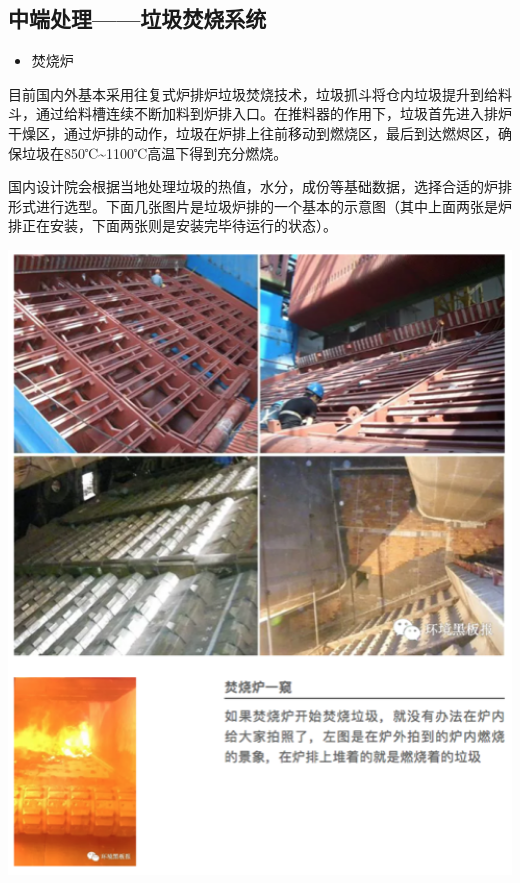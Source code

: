 \documentclass[
]{book}
\providecommand{\tightlist}{%
  \setlength{\itemsep}{0pt}\setlength{\parskip}{0pt}}
\begin{document}
\hypertarget{ux4e2dux7aefux5904ux7406ux5783ux573eux711aux70e7ux7cfbux7edf}{%
\subsection{中端处理------垃圾焚烧系统}\label{ux4e2dux7aefux5904ux7406ux5783ux573eux711aux70e7ux7cfbux7edf}}

\begin{itemize}
\tightlist
\item
  焚烧炉
\end{itemize}

目前国内外基本采用往复式炉排炉垃圾焚烧技术，垃圾抓斗将仓内垃圾提升到给料斗，通过给料槽连续不断加料到炉排入口。在推料器的作用下，垃圾首先进入排炉干燥区，通过炉排的动作，垃圾在炉排上往前移动到燃烧区，最后到达燃烬区，确保垃圾在850℃\textasciitilde1100℃高温下得到充分燃烧。

国内设计院会根据当地处理垃圾的热值，水分，成份等基础数据，选择合适的炉排形式进行选型。下面几张图片是垃圾炉排的一个基本的示意图（其中上面两张是炉排正在安装，下面两张则是安装完毕待运行的状态）。

\includegraphics[width=6.72in]{images/ljfs4}
\end{document}

